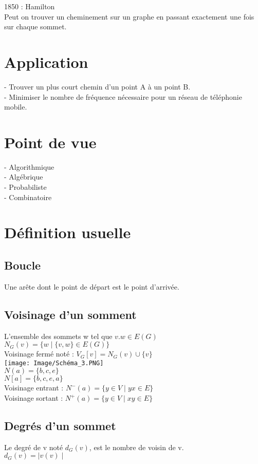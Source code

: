 \documentclass{article}
\begin{document}
1850 : Hamilton \\
Peut on trouver un cheminement sur un graphe en passant exactement une fois sur chaque sommet. \\
\section{Application}
- Trouver un plus court chemin d’un point A à un point B.\\

- Minimiser le nombre de fréquence nécessaire pour un réseau de téléphonie mobile. \\
\section{Point de vue}
- Algorithmique \\

- Algébrique \\

- Probabiliste \\

- Combinatoire \\

\section{Définition usuelle}
\subsection{Boucle}
Une arête dont le point de départ est le point d’arrivée. 
\newpage
\subsection{Voisinage d'un somment}
L’ensemble des sommets w tel que $ v.w \in E(G)$ \\
$ N_G(v)=\{w \mid \{v,w\} \in E(G) \} $ \\
Voisinage fermé noté : $ V_{G}[v]=N_{G}(v) \cup \{v\} $ \\
\texttt{[image: Image/Schéma\_3.PNG]} \\
$ N(a)=\{b,c,e\} $ \\
$ N[a]=\{b,c,e,a\} $ \\
Voisinage entrant : $ N^{-}(a)=\{y \in V \mid yx \in E\} $ \\
Voisinage sortant : $ N^{+}(a)=\{y \in V \mid xy \in E\} $ \\ 

\subsection{Degrés d'un sommet}
Le degré de v noté $d_{G}(v)$, est le nombre de voisin de v.  \\
$ d_{G}(v)=\mid v(v) \mid $ \\
\end{document}
